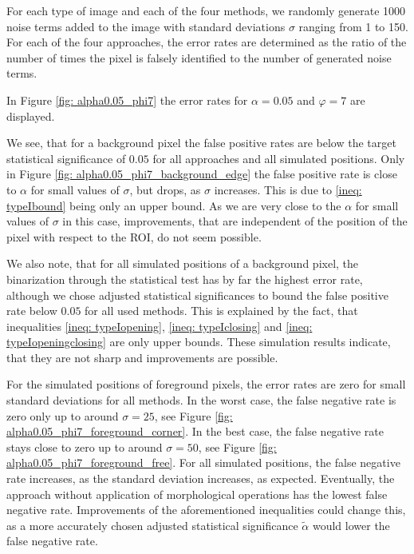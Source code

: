 \documentclass[a4paper,12pt]{article}
\theoremstyle{plain}
\theoremstyle{definition}
\numberwithin{equation}{section}
\begin{document}
For each type of image and each of the four methods, we randomly generate 1000 noise terms added to the image with standard deviations $\sigma$ ranging from 1 to 150. For each of the four approaches, the error rates are determined as the ratio of the number of times the pixel is falsely identified to the number of generated noise terms.

In Figure \ref{fig: alpha0.05_phi7} the error rates for $\alpha = 0.05$ and $\varphi = 7$ are displayed.

We see, that for a background pixel the false positive rates are below the target statistical significance of $0.05$ for all approaches and all simulated positions. Only in Figure \ref{fig: alpha0.05_phi7_background_edge} the false positive rate is close to $\alpha$ for small values of $\sigma$, but drops, as $\sigma$ increases. This is due to \eqref{ineq: typeIbound} being only an upper bound. As we are very close to the $\alpha$ for small values of $\sigma$ in this case, improvements, that are independent of the position of the pixel with respect to the ROI, do not seem possible.

We also note, that for all simulated positions of a background pixel, the binarization through the statistical test has by far the highest error rate, although we chose adjusted statistical significances to bound the false positive rate below $0.05$ for all used methods. This is explained by the fact, that inequalities \eqref{ineq: typeIopening}, \eqref{ineq: typeIclosing} and \eqref{ineq: typeIopeningclosing} are only upper bounds. These simulation results indicate, that they are not sharp and improvements are possible.

For the simulated positions of foreground pixels, the error rates are zero for small standard deviations for all methods. In the worst case, the false negative rate is zero only up to around $\sigma = 25$, see Figure \ref{fig: alpha0.05_phi7_foreground_corner}. In the best case, the false negative rate stays close to zero up to around $\sigma = 50$, see Figure \ref{fig: alpha0.05_phi7_foreground_free}. For all simulated positions, the false negative rate increases, as the standard deviation increases, as expected. Eventually, the approach without application of morphological operations has the lowest false negative rate. Improvements of the aforementioned inequalities could change this, as a more accurately chosen adjusted statistical significance $\tilde{\alpha}$ would lower the false negative rate.


\end{document}
